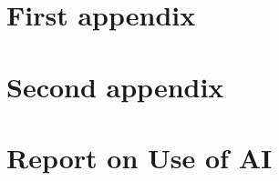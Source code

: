 \documentclass{mcmthesis}
\begin{document}
	
	
	
%	
		
%		
%		
%		
%		
	
	
	
	
	
	
	
	
	
	
	\newpage
	\printbibliography
	
	
	
	
	\begin{appendices}
		\section{First appendix}
		\section{Second appendix}
	\end{appendices}
	
	
	
	
	\newpage
	\setcounter{lastpage}{\value{page}}
	\thispagestyle{empty} 
	
	\section*{Report on Use of AI}
	
\end{document}
